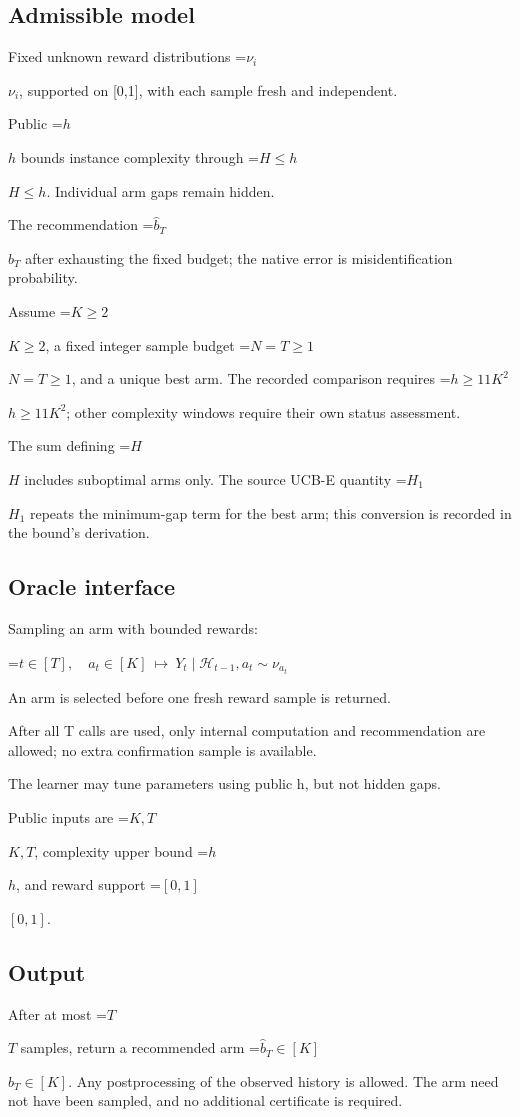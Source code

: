 \documentclass[10pt,a4paper]{article}
\newcommand{\AtlasMath}[1]{\par\begingroup\centering\setbox0=\hbox{$\displaystyle #1$}\ifdim\wd0>1.4\linewidth\typeout{ATLAS WIDE FORMULA: \the\wd0}\fi\ifdim\wd0>\linewidth\resizebox{\linewidth}{!}{\box0}\else\box0\fi\par\endgroup}
\newcommand{\AtlasInlineMath}[1]{\begingroup\setbox0=\hbox{$#1$}\ifdim\wd0>.4\linewidth\endgroup\AtlasMath{#1}\else\endgroup$#1$\fi}
\begin{document}
\subsection{Admissible model}
Fixed unknown reward distributions \AtlasInlineMath{\nu_i}, supported on [0,1], with each sample fresh and independent.

Public \AtlasInlineMath{h} bounds instance complexity through \AtlasInlineMath{H\le h}. Individual arm gaps remain hidden.

The recommendation \AtlasInlineMath{\widehat b_T} after exhausting the fixed budget; the native error is misidentification probability.

Assume \AtlasInlineMath{K\ge2}, a fixed integer sample budget \AtlasInlineMath{N=T\ge1}, and a unique best arm. The recorded comparison requires \AtlasInlineMath{h\ge11K^2}; other complexity windows require their own status assessment.

The sum defining \AtlasInlineMath{H} includes suboptimal arms only. The source UCB-E quantity \AtlasInlineMath{H_1} repeats the minimum-gap term for the best arm; this conversion is recorded in the bound's derivation.

\subsection{Oracle interface}
Sampling an arm with bounded rewards:


\AtlasMath{t\in[T],\quad a_t\in[K]\ \longmapsto\ Y_t\mid\mathcal{H}_{t-1},a_t\sim\nu_{a_t}}


An arm is selected before one fresh reward sample is returned.

After all T calls are used, only internal computation and recommendation are allowed; no extra confirmation sample is available.

The learner may tune parameters using public h, but not hidden gaps.

Public inputs are \AtlasInlineMath{K,T}, complexity upper bound \AtlasInlineMath{h}, and reward support \AtlasInlineMath{[0,1]}.

\subsection{Output}
After at most \AtlasInlineMath{T} samples, return a recommended arm \AtlasInlineMath{\widehat{b}_T\in[K]}. Any postprocessing of the observed history is allowed. The arm need not have been sampled, and no additional certificate is required.
\end{document}
